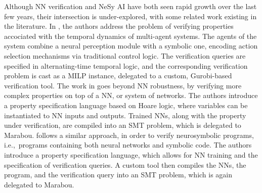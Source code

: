 Although NN verification and NeSy AI have both seen rapid growth over the last few years, their intersection is under-explored, with some related work existing in the literature. In \cite{akintunde2020verifying}, the authors address the problem of verifying properties accociated with the temporal dynamics of multi-agent systems. The agents of the system combine a neural perception module with a symbolic one, encoding action selection mechanisms via traditional control logic. The verification queries are specified in alternating-time temporal logic, and the corresponding verification problem is cast as a MILP instance, delegated to a custom, Gurobi-based verification tool. The work in \cite{xie2022neuro} goes beyond NN robustness, by verifying more complex properties on top of a NN, or system of networks. The authors introduce a property specification language based on Hoare logic, where variables can be instantiated to NN inputs and outputs. Trained NNs, along with the property under verification, are compiled into an SMT problem, which is delegated to Marabou. \cite{daggitt2024vehiclebridgingembeddinggap} follows a similar approach, in order to verify neurosymbolic programs, i.e.,\ programs containing both neural networks and symbolic code. The authors introduce a property specification language, which allows for NN training and the specification of verification queries. A custom tool then compiles the NNs, the program, and the verification query into an SMT problem, which is again delegated to Marabou.




